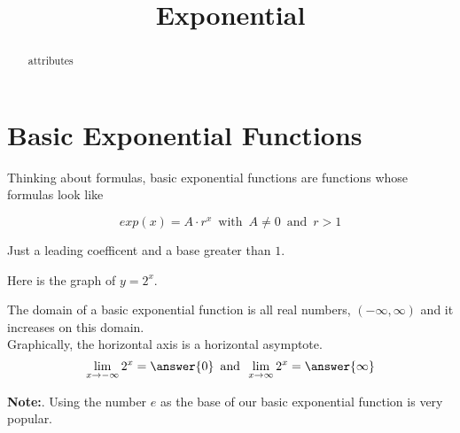 \documentclass{ximera}
\title{Exponential}
\begin{document}
\begin{abstract}
attributes
\end{abstract}
\maketitle


\section*{Basic Exponential Functions}

Thinking about formulas, basic exponential functions are functions whose formulas look like

\[
exp(x) = A \cdot r^x \, \text{ with } \, A \ne 0 \, \text{ and } \, r > 1
\]

Just a leading coefficent and a base greater than $1$. \\



\begin{example}

Here is the graph of $y = 2^x$.

\begin{image}
\end{image}


The domain of a basic exponential function is all real numbers, $(-\infty, \infty)$ and it increases on this domain.  \\

Graphically, the horizontal axis is a horizontal asymptote.\\



\[  \lim_{x \to -\infty} 2^x = \answer{0}     \, \text{ and } \,  \lim_{x \to \infty} 2^x = \answer{\infty}   \]


\textbf{Note:}. Using the number $e$ as the base of our basic exponential function is very popular.

\end{example}
\end{document}
